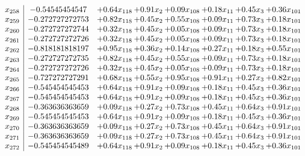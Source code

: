 \documentclass[8pt]{article}
\begin{document}
\[\begin{array}{c| c c@{\hskip 2pt} c@{\hskip 2pt} c@{\hskip 2pt} c@{\hskip 2pt} c@{\hskip 2pt} c@{\hskip 2pt} }
 x_{258}   &  -0.54545454547 & +  0.64 x_{118} & +  0.91 x_{2} & +  0.09 x_{108} & +  0.18 x_{11} & +  0.45 x_{3} & +  0.36 x_{101}\\
 x_{259}   &  -0.272727272753 & +  0.82 x_{118} & +  0.45 x_{2} & +  0.55 x_{108} & +  0.09 x_{11} & +  0.73 x_{3} & +  0.18 x_{101}\\
 x_{260}   &  -0.272727272744 & +  0.32 x_{118} & +  0.45 x_{2} & +  0.05 x_{108} & +  0.09 x_{11} & +  0.73 x_{3} & +  0.18 x_{101}\\
 x_{261}   &  -0.272727272726 & +  0.32 x_{118} & +  0.45 x_{2} & +  0.05 x_{108} & +  0.09 x_{11} & +  0.73 x_{3} & +  0.18 x_{101}\\
 x_{262}   &  -0.818181818197 & +  0.95 x_{118} & +  0.36 x_{2} & +  0.14 x_{108} & +  0.27 x_{11} & +  0.18 x_{3} & +  0.55 x_{101}\\
 x_{263}   &  -0.272727272735 & +  0.82 x_{118} & +  0.45 x_{2} & +  0.55 x_{108} & +  0.09 x_{11} & +  0.73 x_{3} & +  0.18 x_{101}\\
 x_{264}   &  -0.272727272726 & +  0.32 x_{118} & +  0.45 x_{2} & +  0.05 x_{108} & +  0.09 x_{11} & +  0.73 x_{3} & +  0.18 x_{101}\\
 x_{265}   &  -0.727272727291 & +  0.68 x_{118} & +  0.55 x_{2} & +  0.95 x_{108} & +  0.91 x_{11} & +  0.27 x_{3} & +  0.82 x_{101}\\
 x_{266}   &  -0.545454545453 & +  0.64 x_{118} & +  0.91 x_{2} & +  0.09 x_{108} & +  0.18 x_{11} & +  0.45 x_{3} & +  0.36 x_{101}\\
 x_{267}   &  -0.545454545453 & +  0.64 x_{118} & +  0.91 x_{2} & +  0.09 x_{108} & +  0.18 x_{11} & +  0.45 x_{3} & +  0.36 x_{101}\\
 x_{268}   &  -0.363636363659 & +  0.09 x_{118} & +  0.27 x_{2} & +  0.73 x_{108} & +  0.45 x_{11} & +  0.64 x_{3} & +  0.91 x_{101}\\
 x_{269}   &  -0.545454545453 & +  0.64 x_{118} & +  0.91 x_{2} & +  0.09 x_{108} & +  0.18 x_{11} & +  0.45 x_{3} & +  0.36 x_{101}\\
 x_{270}   &  -0.363636363659 & +  0.09 x_{118} & +  0.27 x_{2} & +  0.73 x_{108} & +  0.45 x_{11} & +  0.64 x_{3} & +  0.91 x_{101}\\
 x_{271}   &  -0.363636363659 & +  0.09 x_{118} & +  0.27 x_{2} & +  0.73 x_{108} & +  0.45 x_{11} & +  0.64 x_{3} & +  0.91 x_{101}\\
 x_{272}   &  -0.545454545489 & +  0.64 x_{118} & +  0.91 x_{2} & +  0.09 x_{108} & +  0.18 x_{11} & +  0.45 x_{3} & +  0.36 x_{101}\\

\end{array}\]
\end{document}
